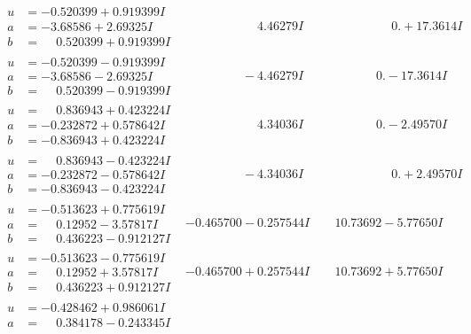 \documentclass[1p]{elsarticle_modified}
\theoremstyle{definition}
\begin{document}
$$\begin{array}{c|c|c}
\begin{aligned}
u &= -0.520399 + 0.919399 I \\
a &= -3.68586 + 2.69325 I \\
b &= \phantom{-}0.520399 + 0.919399 I\end{aligned}
 & \phantom{-0.000000 -}4.46279 I & \phantom{-0.000000 -}0. + 17.3614 I \\ \hline\begin{aligned}
u &= -0.520399 - 0.919399 I \\
a &= -3.68586 - 2.69325 I \\
b &= \phantom{-}0.520399 - 0.919399 I\end{aligned}
 & \phantom{-0.000000 } -4.46279 I & \phantom{-0.000000 } 0. - 17.3614 I \\ \hline\begin{aligned}
u &= \phantom{-}0.836943 + 0.423224 I \\
a &= -0.232872 + 0.578642 I \\
b &= -0.836943 + 0.423224 I\end{aligned}
 & \phantom{-0.000000 -}4.34036 I & \phantom{-0.000000 } 0. - 2.49570 I \\ \hline\begin{aligned}
u &= \phantom{-}0.836943 - 0.423224 I \\
a &= -0.232872 - 0.578642 I \\
b &= -0.836943 - 0.423224 I\end{aligned}
 & \phantom{-0.000000 } -4.34036 I & \phantom{-0.000000 -}0. + 2.49570 I \\ \hline\begin{aligned}
u &= -0.513623 + 0.775619 I \\
a &= \phantom{-}0.12952 - 3.57817 I \\
b &= \phantom{-}0.436223 - 0.912127 I\end{aligned}
 & -0.465700 - 0.257544 I & \phantom{-}10.73692 - 5.77650 I \\ \hline\begin{aligned}
u &= -0.513623 - 0.775619 I \\
a &= \phantom{-}0.12952 + 3.57817 I \\
b &= \phantom{-}0.436223 + 0.912127 I\end{aligned}
 & -0.465700 + 0.257544 I & \phantom{-}10.73692 + 5.77650 I \\ \hline\begin{aligned}
u &= -0.428462 + 0.986061 I \\
a &= \phantom{-}0.384178 - 0.243345 I \\

\end{aligned}
\end{array}$$
\end{document}
